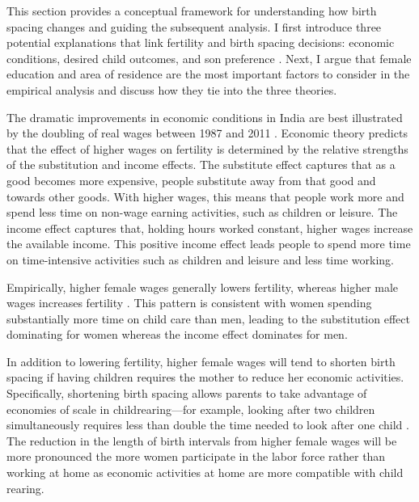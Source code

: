 This section provides a conceptual framework for understanding how birth spacing changes
and guiding the subsequent analysis.
I first introduce three potential explanations that link fertility and birth 
spacing decisions: economic conditions, desired child outcomes, and son preference 
\citep{Casterline2016,Portner2018}.
Next, I argue that female education and area of residence are the most important factors 
to consider in the empirical analysis and discuss how they tie into the three theories.




The dramatic improvements in economic conditions in India are best illustrated by the 
doubling of real wages between 1987 and 2011 \citep{Klasen2015}.
Economic theory predicts that the effect of higher wages on fertility is determined by 
the relative strengths of the substitution and income effects.
The substitute effect captures that as a good becomes more expensive, people substitute 
away from that good and towards other goods.
With higher wages, this means that people work more and spend less time on non-wage 
earning activities, such as children or leisure.
The income effect captures that, holding hours worked constant, higher wages increase the 
available income. 
This positive income effect leads people to spend more time on time-intensive activities 
such as children and leisure and less time working.

Empirically, higher female wages generally lowers fertility, whereas higher male 
wages increases fertility \citet{Hotz1997,schultz97}.
This pattern is consistent with women spending substantially more time on child care 
than men, leading to the substitution effect dominating for women whereas the income
effect dominates for men.

In addition to lowering fertility, higher female wages will tend to shorten birth spacing 
if having children requires the mother to reduce her economic activities.
Specifically, shortening birth spacing allows parents to take advantage of economies of 
scale in childrearing---for example, looking after two children simultaneously requires 
less than double the time needed to look after one child \citep{Vijverberg1982,Hotz1997}.
The reduction in the length of birth intervals from higher female wages will be more 
pronounced the more women participate in the labor force rather than working at home as 
economic activities at home are more compatible with child rearing.


